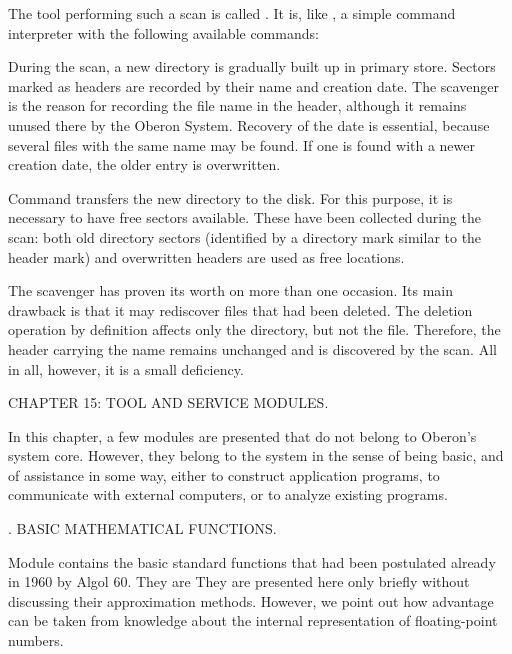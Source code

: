 The tool performing such a scan is called . It is, like , a simple command interpreter with the following available commands:


During the scan, a new directory is gradually built up in primary store. Sectors marked as headers are recorded by their name and creation date. The scavenger is the reason for recording the file name in the header, although it remains unused there by the Oberon System. Recovery of the date is essential, because several files with the same name may be found. If one is found with a newer creation date, the older entry is overwritten.

Command  transfers the new directory to the disk. For this purpose, it is necessary to have free sectors available. These have been collected during the scan: both old directory sectors (identified by a directory mark similar to the header mark) and overwritten headers are used as free locations.

The scavenger has proven its worth on more than one occasion. Its main drawback is that it may rediscover files that had been deleted. The deletion operation by definition affects only the directory, but not the file. Therefore, the header carrying the name remains unchanged and is discovered by the scan. All in all, however, it is a small deficiency.

\beginchapter CHAPTER 15: TOOL AND SERVICE MODULES.

In this chapter, a few modules are presented that do not belong to Oberon's system core. However, they belong to the system in the sense of being basic, and of assistance in some way, either to construct application programs, to communicate with external computers, or to analyze existing programs.

. BASIC MATHEMATICAL FUNCTIONS.

Module  contains the basic standard functions that had been postulated already in 1960 by Algol 60. They are
They are presented here only briefly without discussing their approximation methods. However, we point out how advantage can be taken from knowledge about the internal representation of floating-point numbers.

